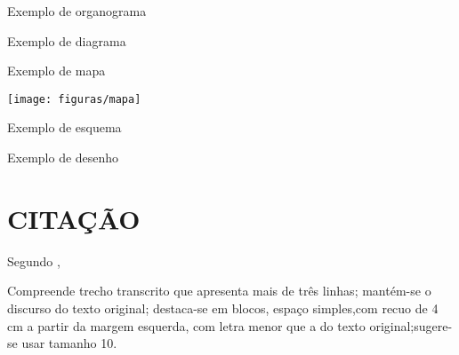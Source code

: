 \begin{organograma}[htb]
	\caption{Exemplo de organograma}
	\label{orga:grafico5}
\end{organograma}
\begin{diagrama}[htb]
	\caption{Exemplo de diagrama}
	\label{diag:grafico6}
\end{diagrama}

\begin{mapa}[htb]
	\caption{Exemplo de mapa}
	\label{map:grafico7}
 	\texttt{[image: figuras/mapa]}
\end{mapa}

\begin{esquema}[htb]
	\caption{Exemplo de esquema}
	\label{esq:grafico10}
\end{esquema}

\begin{desenho}[htb]
	\caption{Exemplo de desenho}
	\label{des:grafico9}
\end{desenho}
\cleardoublepage

\section{CITAÇÃO}

Segundo  ,
\begin{citacao}
Compreende trecho transcrito que apresenta mais de três linhas; mantém-se o discurso do texto original; destaca-se em blocos, espaço simples,com recuo de 4 cm a partir da margem esquerda, com letra menor que a do texto original;sugere-se usar tamanho 10.
\end{citacao}

